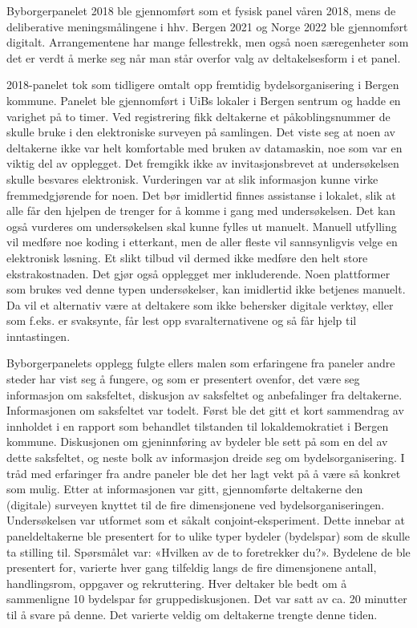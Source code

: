\documentclass[
  12pt,
  a4paper, 12pt]{article}
\begin{document}
Byborgerpanelet 2018 ble gjennomført som et fysisk panel våren 2018, mens de deliberative meningsmålingene i hhv. Bergen 2021 og Norge 2022 ble gjennomført digitalt. Arrangementene har mange fellestrekk, men også noen særegenheter som det er verdt å merke seg når man står overfor valg av deltakelsesform i et panel.

2018-panelet tok som tidligere omtalt opp fremtidig bydelsorganisering i Bergen kommune. Panelet ble gjennomført i UiBs lokaler i Bergen sentrum og hadde en varighet på to timer. Ved registrering fikk deltakerne et påkoblingsnummer de skulle bruke i den elektroniske surveyen på samlingen. Det viste seg at noen av deltakerne ikke var helt komfortable med bruken av datamaskin, noe som var en viktig del av opplegget. Det fremgikk ikke av invitasjonsbrevet at undersøkelsen skulle besvares elektronisk. Vurderingen var at slik informasjon kunne virke fremmedgjørende for noen. Det bør imidlertid finnes assistanse i lokalet, slik at alle får den hjelpen de trenger for å komme i gang med undersøkelsen. Det kan også vurderes om undersøkelsen skal kunne fylles ut manuelt. Manuell utfylling vil medføre noe koding i etterkant, men de aller fleste vil sannsynligvis velge en elektronisk løsning. Et slikt tilbud vil dermed ikke medføre den helt store ekstrakostnaden. Det gjør også opplegget mer inkluderende. Noen plattformer som brukes ved denne typen undersøkelser, kan imidlertid ikke betjenes manuelt. Da vil et alternativ være at deltakere som ikke behersker digitale verktøy, eller som f.eks. er svaksynte, får lest opp svaralternativene og så får hjelp til inntastingen.

Byborgerpanelets opplegg fulgte ellers malen som erfaringene fra paneler andre steder har vist seg å fungere, og som er presentert ovenfor, det være seg informasjon om saksfeltet, diskusjon av saksfeltet og anbefalinger fra deltakerne. Informasjonen om saksfeltet var todelt. Først ble det gitt et kort sammendrag av innholdet i en rapport som behandlet tilstanden til lokaldemokratiet i Bergen kommune. Diskusjonen om gjeninnføring av bydeler ble sett på som en del av dette saksfeltet, og neste bolk av informasjon dreide seg om bydelsorganisering. I tråd med erfaringer fra andre paneler ble det her lagt vekt på å være så konkret som mulig. Etter at informasjonen var gitt, gjennomførte deltakerne den (digitale) surveyen knyttet til de fire dimensjonene ved bydelsorganiseringen. Undersøkelsen var utformet som et såkalt conjoint-eksperiment. Dette innebar at paneldeltakerne ble presentert for to ulike typer bydeler (bydelspar) som de skulle ta stilling til. Spørsmålet var: «Hvilken av de to foretrekker du?». Bydelene de ble presentert for, varierte hver gang tilfeldig langs de fire dimensjonene antall, handlingsrom, oppgaver og rekruttering. Hver deltaker ble bedt om å sammenligne 10 bydelspar før gruppediskusjonen. Det var satt av ca. 20 minutter til å svare på denne. Det varierte veldig om deltakerne trengte denne tiden.
\end{document}
